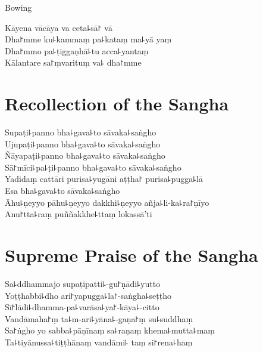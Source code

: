 \clearpage

\begin{instruction}%
  Bowing
\end{instruction}

Kāyena vācāya va ceta꜕sā꜓ vā\\
Dha꜓mme ku꜕kammaṃ pa꜕kataṃ ma꜕yā yaṃ\\
Dha꜓mmo pa꜕ṭiggaṇhā꜕tu acca꜕yantaṃ\\
Kālantare sa꜓ṃvarituṃ va꜕ dha꜓mme

\chapter{Recollection of the Sangha}%

\begin{leader}
\end{leader}

Supaṭi꜕panno bha꜕gava꜕to sāvaka꜕saṅgho\\
Ujupaṭi꜕panno bha꜕gava꜕to sāvaka꜕saṅgho\\
Ñāyapaṭi꜕panno bha꜕gava꜕to sāvaka꜕saṅgho\\
Sā꜓mīci꜕pa꜕ṭi꜕panno bha꜕gava꜕to sāvaka꜕saṅgho\\
Yadidaṃ cattāri purisa꜕yugāni aṭṭha꜓ purisa꜕pugga꜕lā\\
Esa bha꜕gava꜕to sāvaka꜕saṅgho\\
Āhu꜕ṇeyyo pāhu꜕ṇeyyo dakkhi꜕ṇeyyo añja꜕li-ka꜕ra꜓ṇīyo\\
Anu꜓tta꜕raṃ puññakkhe꜕ttaṃ lokassā'ti

\chapter{Supreme Praise of the Sangha}%

\begin{leader}
\end{leader}

Sa꜕ddhammajo supaṭipatti꜕-gu꜓ṇādi꜕yutto\\
Yoṭṭhabbi꜕dho ari꜓yapugga꜕la꜓-saṅgha꜕seṭṭho\\
Sī꜓lādi꜕dhamma-pa꜕varāsa꜕ya꜓-kāya꜕-citto\\
Vandāmaha꜓ṃ ta꜕m-ari꜕yāna꜕-gaṇa꜓ṃ su꜕suddhaṃ\\
Sa꜓ṅgho yo sabba꜕pāṇīnaṃ sa꜕raṇaṃ khema꜕mutta꜕maṃ\\
Ta꜕tiyānussa꜕tiṭṭhānaṃ vandāmi꜕ taṃ si꜓rena꜕haṃ

